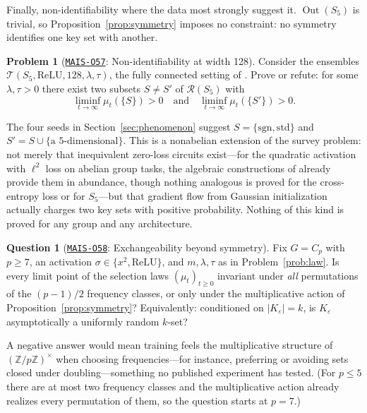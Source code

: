 \documentclass[11pt]{amsart}
\newcommand{\Oid}[1]{\href{https://github.com/lionellevine/MAIS/blob/main/open-problems/MAIS-O#1.md}{\texttt{MAIS-O#1}}}
\theoremstyle{plain}
\theoremstyle{definition}
\newtheorem{problem}[theorem]{Problem}
\newtheorem{question}[theorem]{Question}
\DeclareMathOperator{\Out}{Out}
\newcommand{\Z}{\mathbb{Z}}
\newcommand{\Rcl}{\mathcal{R}}
\begin{document}
Finally, non-identifiability where the data most strongly suggest it. $\Out(S_5)$ is trivial, so Proposition~\ref{prop:symmetry} imposes no constraint: no symmetry identifies one key set with another.

\begin{problem}[\Oid{57}: Non-identifiability at width 128]\label{prob:nonident}
Consider the ensembles $\mathcal{T}(S_5, \mathrm{ReLU}, 128, \lambda, \tau)$, the fully connected setting of \cite{chughtai2023}. Prove or refute: for some $\lambda, \tau > 0$ there exist two subsets $S \neq S'$ of $\Rcl(S_5)$ with
\[
   \liminf_{t \to \infty} \mu_t(\{S\}) > 0 \quad\text{and}\quad \liminf_{t \to \infty} \mu_t(\{S'\}) > 0.
\]
\end{problem}

The four seeds in Section~\ref{sec:phenomenon} suggest $S = \{\mathrm{sgn}, \mathrm{std}\}$ and $S' = S \cup \{\text{a 5-dimensional}\}$. This is a nonabelian extension of the survey problem: not merely that inequivalent zero-loss circuits exist---for the quadratic activation with $\ell^2$ loss on abelian group tasks, the algebraic constructions of \cite{tian2024} already provide them in abundance, though nothing analogous is proved for the cross-entropy loss or for $S_5$---but that gradient flow from Gaussian initialization actually charges two key sets with positive probability. Nothing of this kind is proved for any group and any architecture.

\begin{question}[\Oid{58}: Exchangeability beyond symmetry]\label{q:exchangeable}
Fix $G = C_p$ with $p \geq 7$, an activation $\sigma \in \{x^2, \mathrm{ReLU}\}$, and $m, \lambda, \tau$ as in Problem~\ref{prob:law}. Is every limit point of the selection laws $(\mu_t)_{t \geq 0}$ invariant under \emph{all} permutations of the $(p-1)/2$ frequency classes, or only under the multiplicative action of Proposition~\ref{prop:symmetry}? Equivalently: conditioned on $|K_\varepsilon| = k$, is $K_\varepsilon$ asymptotically a uniformly random $k$-set?
\end{question}

A negative answer would mean training feels the multiplicative structure of $(\Z/p\Z)^\times$ when choosing frequencies---for instance, preferring or avoiding sets closed under doubling---something no published experiment has tested. (For $p \leq 5$ there are at most two frequency classes and the multiplicative action already realizes every permutation of them, so the question starts at $p = 7$.)
\end{document}
